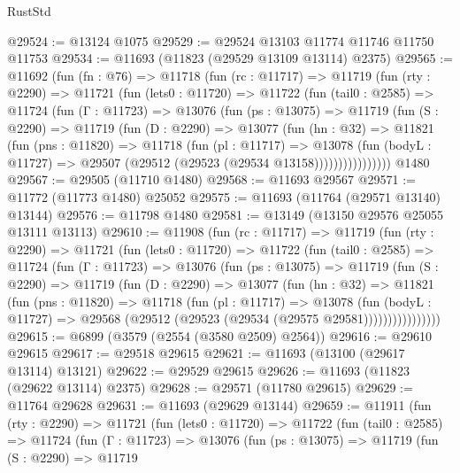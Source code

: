 \begin{lexlean}{RustStd}
\begin{coremodule}
@29524 := @13124 @1075
@29529 := @29524 @13103 @11774 @11746 @11750 @11753
@29534 := @11693 (@11823 (@29529 @13109 @13114) @2375)
@29565 := @11692
    (fun (fn : @76) =>
    @11718
      (fun (rc : @11717) =>
      @11719
        (fun (rty : @2290) =>
        @11721
          (fun (lets0 : @11720) =>
          @11722
            (fun (tail0 : @2585) =>
            @11724
              (fun (Γ : @11723) =>
              @13076
                (fun (ps : @13075) =>
                @11719
                  (fun (S : @2290) =>
                  @11719
                    (fun (D : @2290) =>
                    @13077
                      (fun (hn : @32) =>
                      @11821
                        (fun (pns : @11820) =>
                        @11718
                          (fun (pl : @11717) =>
                          @13078
                            (fun (bodyL : @11727) =>
                            @29507 (@29512 (@29523 (@29534 @13158))))))))))))))))
    @1480
@29567 := @29505 (@11710 @1480)
@29568 := @11693 @29567
@29571 := @11772 (@11773 @1480) @25052
@29575 := @11693 (@11764 (@29571 @13140) @13144)
@29576 := @11798 @1480
@29581 := @13149 (@13150 @29576 @25055 @13111 @13113)
@29610 := @11908
    (fun (rc : @11717) =>
    @11719
      (fun (rty : @2290) =>
      @11721
        (fun (lets0 : @11720) =>
        @11722
          (fun (tail0 : @2585) =>
          @11724
            (fun (Γ : @11723) =>
            @13076
              (fun (ps : @13075) =>
              @11719
                (fun (S : @2290) =>
                @11719
                  (fun (D : @2290) =>
                  @13077
                    (fun (hn : @32) =>
                    @11821
                      (fun (pns : @11820) =>
                      @11718
                        (fun (pl : @11717) =>
                        @13078
                          (fun (bodyL : @11727) =>
                          @29568 (@29512 (@29523 (@29534 (@29575 @29581))))))))))))))))
@29615 := @6899 (@3579 (@2554 (@3580 @2509) @2564))
@29616 := @29610 @29615
@29617 := @29518 @29615
@29621 := @11693 (@13100 (@29617 @13114) @13121)
@29622 := @29529 @29615
@29626 := @11693 (@11823 (@29622 @13114) @2375)
@29628 := @29571 (@11780 @29615)
@29629 := @11764 @29628
@29631 := @11693 (@29629 @13144)
@29659 := @11911
    (fun (rty : @2290) =>
    @11721
      (fun (lets0 : @11720) =>
      @11722
        (fun (tail0 : @2585) =>
        @11724
          (fun (Γ : @11723) =>
          @13076
            (fun (ps : @13075) =>
            @11719
              (fun (S : @2290) =>
              @11719

\end{coremodule}
\end{lexlean}
